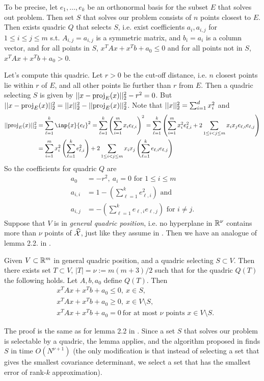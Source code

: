 \documentclass{article}
\begin{document}
To be precise, let $e_1,\dots,e_k$ be an orthonormal basis for the subset $E$ that solves out problem. Then set $S$ that solves our problem consists of $n$ points closest to $E$. Then exists quadric $Q$ that selects $S$, i.e. exist coefficients $a_i, a_{i,j}$ for $1\leq i\leq j\leq m$ s.t. $A_{i,j} = a_{i,j}$ is a symmetric matrix, and $b_i = a_i$ is a column vector, and for all points in $S$, $x^TAx + x^Tb + a_0 \leq 0$ and for all points not in $S$, $x^TAx + x^Tb + a_0 > 0$.

Let's compute this quadric. Let $r>0$ be the cut-off distance, i.e. $n$ closest points lie within $r$ of $E$, and all other points lie further than $r$ from $E$. Then a quadric selecting $S$ is given by $||x - \text{proj}_{E}(x)||_2^2 - r^2 = 0$. But $||x - \text{proj}_{E}(x)||_2^2 = ||x||_2^2 - ||\text{proj}_{E}(x)||_2^2$. Note that $||x||_2^2 = \sum_{i=1}^d x_i^2$ and 
\begin{align*}
    \norm{\proj_{E}(x)}_2^2 &= \sum_{\ell=1}^k \inp{x}{e_\ell}^2 = \sum_{\ell=1}^k \left(\sum_{i=1}^m x_i e_{\ell,i}\right)^2 = \sum_{\ell=1}^k \left( \sum_{i=1}^m x_i^2 e_{\ell,i}^2 + 2\sum_{1\leq i < j\leq m} x_ix_j e_{\ell,i}e_{\ell,j} \right)\\
    &= \sum_{i=1}^m x_i^2 \left(\sum_{\ell=1}^k  e_{\ell,i}^2\right) + 2\sum_{1\leq i < j\leq m} x_ix_j \left(\sum_{\ell=1}^k  e_{\ell,i}e_{\ell,j} \right)
\end{align*}
So the coefficients for quadric $Q$ are
\begin{align*}
    a_0 &= -r^2,\ a_i = 0 \text{ for $1\leq i\leq m$}\\
    a_{i,i} &= 1 - \left(\sum_{\ell=1}^k  e_{\ell,i}^2 \right) \text{ and } \\
    a_{i,j} &= - \left(\sum_{\ell=1}^k  e_{\ell,i}e_{\ell,j} \right)\text{ for $i\neq j$}.
\end{align*}
Suppose that $V$ is in \textit{general quadric position}, i.e. no hyperplane in $\mathbb{R}^\nu$ contains more than $\nu$ points of $\widehat{\mathcal{X}}$, just like they assume in \cite{bernholt2004complexity}. Then we have an analogue of lemma 2.2. in \cite{bernholt2004complexity}. 
\begin{lemma}
Given $V\subset \mathbb{R}^m$ in general quadric position, and a quadric selecting $S\subset V$. Then there exists set $T \subset V$, $|T| = \nu := m(m+3)/2$ such that for the quadric $Q(T)$ the following holds. Let $A,b,a_0$ define $Q(T)$. Then
\begin{align*}
    & x^TAx + x^Tb + a_0 \leq 0,\ x\in S,\\
    & x^TAx + x^Tb + a_0 \geq 0,\ x\in V\setminus S,\\
    & x^TAx + x^Tb + a_0 = 0\ \text{for at most $\nu$ points $x\in V\setminus S$}.
\end{align*}
\end{lemma}
The proof is the same as for lemma 2.2 in \cite{bernholt2004complexity}. Since a set $S$ that solves our problem is selectable by a quadric, the lemma applies, and the algorithm proposed in \cite{bernholt2004complexity} finds $S$ in time $O(N^{\nu+1})$ (the only modification is that instead of selecting a set that gives the smallest covariance determinant, we select a set that has the smallest error of rank-$k$ approximation).
\end{document}

